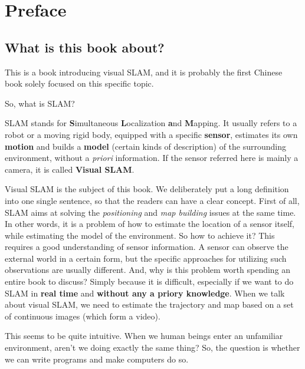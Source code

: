 \chapter{Preface}

\section{What is this book about?}

This is a book introducing visual SLAM, and it is probably the first Chinese book solely focused on this specific topic.

So, what is SLAM?

SLAM stands for \textbf{S}imultaneous \textbf{L}ocalization \textbf{a}nd \textbf{M}apping. It usually refers to a robot or a moving rigid body, equipped with a specific \textbf{sensor}, estimates its own \textbf{motion} and builds a \textbf{model} (certain kinds of description) of the surrounding environment, without a \textit{priori} information\cite{Davison2007}. If the sensor referred here is mainly a camera, it is called \textbf{Visual SLAM}.

Visual SLAM is the subject of this book. We deliberately put a long definition into one single sentence, so that the readers can have a clear concept. First of all, SLAM aims at solving the \textit{positioning} and \textit{map building} issues at the same time. In other words, it is a problem of how to estimate the location of a sensor itself, while estimating the model of the environment. So how to achieve it? This requires a good understanding of sensor information. A sensor can observe the external world in a certain form, but the specific approaches for utilizing such observations are usually different. And, why is this problem worth spending an entire book to discuss? Simply because it is difficult, especially if we want to do SLAM in \textbf{real time} and \textbf{without any a priory knowledge}. When we talk about visual SLAM, we need to estimate the trajectory and map based on a set of continuous images (which form a video).

This seems to be quite intuitive. When we human beings enter an unfamiliar environment, aren't we doing exactly the same thing? So, the question is whether we can write programs and make computers do so. 


